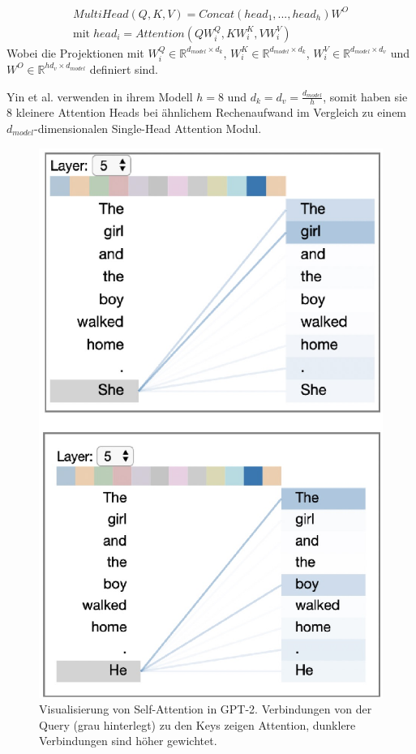 \documentclass[conference]{IEEEtran}
\begin{document}
\begin{eqnarray} \label{eq:multi_head_attention}
    MultiHead(Q,K,V) = Concat(head_1,...,head_h)W^O \\
    \text{mit} \; head_i = Attention(QW_i^Q , KW_i^K , VW_i^V)
\end{eqnarray}
Wobei die Projektionen mit $W_i^Q \in \mathbb{R}^{d_{model} \times d_k}$, $W_i^K \in \mathbb{R}^{d_{model} \times d_k}$, $W_i^V \in \mathbb{R}^{d_{model} \times d_v}$ und $W^O \in \mathbb{R}^{hd_v \times d_{model}}$ definiert sind. \cite{attention_is_all_you_need}

Yin et al. \cite{attention_is_all_you_need} verwenden in ihrem Modell $h = 8$ und $d_k = d_v = \frac{d_{model}}{h}$, somit haben sie 8 kleinere Attention Heads bei ähnlichem Rechenaufwand im Vergleich zu einem $d_{model}$-dimensionalen Single-Head Attention Modul.


\begin{figure}[htbp]
\centerline{\includegraphics{img/attention_visualized.png}}
\caption{Visualisierung von Self-Attention in GPT-2. Verbindungen von der Query (grau hinterlegt) zu den Keys zeigen Attention, dunklere Verbindungen sind höher gewichtet. \cite{visualization_of_attention}}
\label{fig:4}
\end{figure}
\end{document}
